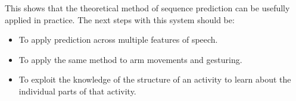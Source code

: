 This shows that the theoretical method of sequence prediction can be
usefully applied in practice.  The next steps with this system should
be:

\begin{itemize}

\item To apply prediction across multiple features of speech.

\item To apply the same method to arm movements and gesturing.

\item To exploit the knowledge of the structure of an activity to
learn about the individual parts of that activity.

\end{itemize}


